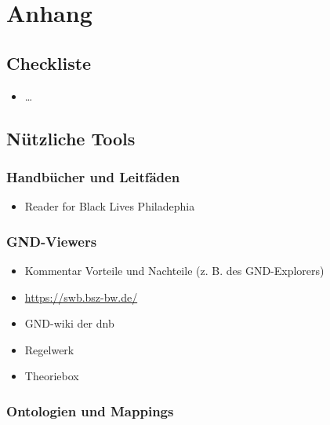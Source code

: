 \documentclass[
  letterpaper,
  DIV=11,
  numbers=noendperiod]{scrartcl}
\providecommand{\tightlist}{%
  \setlength{\itemsep}{0pt}\setlength{\parskip}{0pt}}\usepackage{longtable,booktabs,array}
\begin{document}
\section{Anhang}\label{anhang}

\subsection{Checkliste}\label{checkliste}

\begin{itemize}
\tightlist
\item
  \ldots{}
\end{itemize}

\subsection{Nützliche Tools}\label{nuxfctzliche-tools}

\subsubsection{Handbücher und
Leitfäden}\label{handbuxfccher-und-leitfuxe4den}

\begin{itemize}
\tightlist
\item
  Reader for Black Lives Philadephia
\end{itemize}

\subsubsection{GND-Viewers}\label{gnd-viewers}

\begin{itemize}
\tightlist
\item
  Kommentar Vorteile und Nachteile (z. B. des GND-Explorers)\\
\item
  \href{https://swb.bsz-bw.de/DB=2.104/?COOKIE=Us998,Pbszgast,I2017,B20728+,SY,NRecherche-DB,D2.104,E6b0d3db2-1,A,H,R178.197.206.37,FY}{https://swb.bsz-bw.de/}\\
\item
  GND-wiki der dnb\\
\item
  Regelwerk\\
\item
  Theoriebox
\end{itemize}

\subsubsection{Ontologien und Mappings}\label{ontologien-und-mappings}
\end{document}
